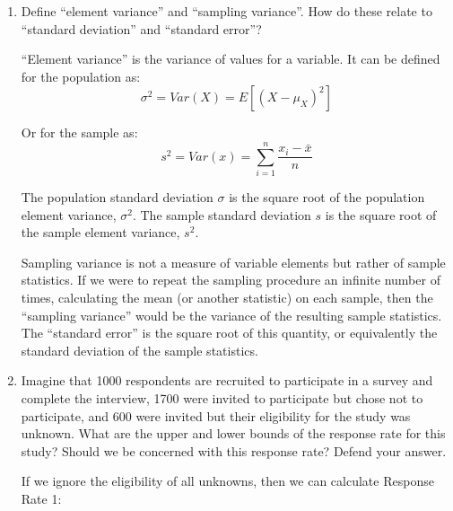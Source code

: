\documentclass[a4paper]{exam}
\begin{document}
\begin{enumerate}
\begin{solution}
\end{solution}

\item Define ``element variance'' and ``sampling variance''. How do these relate to ``standard deviation'' and ``standard error''?

\begin{solution}

``Element variance'' is the variance of values for a variable. It can be defined for the population as:\\

\begin{equation}
\sigma^2 = Var(X) = E \left[ (X - \mu_X)^2 \right]
\end{equation}

Or for the sample as:\\

\begin{equation}
s^2 = Var(x) = \sum_{i=1}^{n} \dfrac{x_i - \bar{x}}{n}
\end{equation}

The population standard deviation $\sigma$ is the square root of the population element variance, $\sigma^2$. The sample standard deviation $s$ is the square root of the sample element variance, $s^2$.

\vspace{1em}

Sampling variance is not a measure of variable elements but rather of sample statistics. If we were to repeat the sampling procedure an infinite number of times, calculating the mean (or another statistic) on each sample, then the ``sampling variance'' would be the variance of the resulting sample statistics. The ``standard error'' is the square root of this quantity, or equivalently the standard deviation of the sample statistics.

\end{solution}

\item Imagine that 1000 respondents are recruited to participate in a survey and complete the interview, 1700 were invited to participate but chose not to participate, and 600 were invited but their eligibility for the study was unknown. What are the upper and lower bounds of the response rate for this study? Should we be concerned with this response rate? Defend your answer.

\begin{solution}

If we ignore the eligibility of all unknowns, then we can calculate Response Rate 1:


\end{solution}
\end{enumerate}
\end{document}
